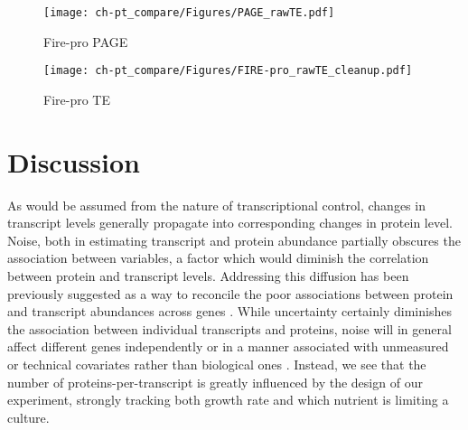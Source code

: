 
\begin{figure}[h!]
\begin{center}
\texttt{[image: ch-pt\_compare/Figures/PAGE\_rawTE.pdf]}
\caption{Fire-pro PAGE}
\label{fpage_te}
\end{center}
\end{figure}


\begin{figure}[h!]
\begin{center}
\texttt{[image: ch-pt\_compare/Figures/FIRE-pro\_rawTE\_cleanup.pdf]}
\caption{Fire-pro TE}
\label{firepro_te}
\end{center}
\end{figure}

\section{Discussion}

As would be assumed from the nature of transcriptional control, changes in transcript levels generally propagate into corresponding changes in protein level.  Noise, both in estimating transcript and protein abundance partially obscures the association between variables, a factor which would diminish the correlation between protein and transcript levels. Addressing this diffusion has been previously suggested as a way to reconcile the poor associations between protein and transcript abundances across genes \cite{Csardi:2015kx}.  While uncertainty certainly diminishes the association between individual transcripts and proteins, noise will in general affect different genes independently or in a manner associated with unmeasured or technical covariates rather than biological ones \cite{Leek:2007kn}. Instead, we see that the number of proteins-per-transcript is greatly influenced by the design of our experiment, strongly tracking both growth rate and which nutrient is limiting a culture.

